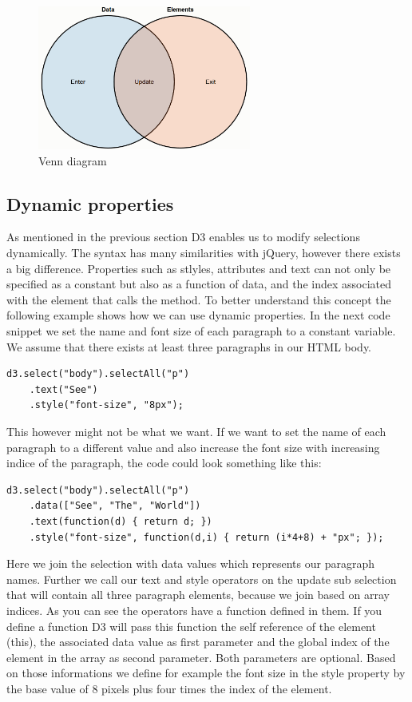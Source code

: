 \documentclass{bioinfo}
\begin{document}
\begin{figure}[!tpb]
\centerline{\includegraphics[width=70mm]{vennDiagram.PNG}} %
\caption{Venn diagram}\label{fig:venn}
\end{figure}


\subsection{Dynamic properties}
As mentioned in the previous section D3 enables us to modify selections dynamically.
The syntax has many similarities with jQuery, however there exists a big difference.
Properties such as stlyles, attributes and text can not only be specified as a constant but also as a function of data, and the index associated with the element that calls the method.
To better understand this concept the following example shows how we can use dynamic properties.
In the next code snippet we set the name and font size of each paragraph to a constant variable.
We assume that there exists at least three paragraphs in our HTML body.
\begin{lstlisting}
d3.select("body").selectAll("p")
    .text("See")
    .style("font-size", "8px");
\end{lstlisting}
This however might not be what we want. 
If we want to set the name of each paragraph to a different value and also increase the font size with increasing indice of the paragraph, the code could look something like this:
\begin{lstlisting}
d3.select("body").selectAll("p")
    .data(["See", "The", "World"])
    .text(function(d) { return d; })
    .style("font-size", function(d,i) { return (i*4+8) + "px"; });
\end{lstlisting}
Here we join the selection with data values which represents our paragraph names. Further we call our text and style operators on the update sub selection that will contain all three paragraph elements, because we join based on array indices.
As you can see the operators have a function defined in them. If you define a function D3 will pass this function the self reference of the element (this), the associated data value as first parameter and the global index of the element in the array as second parameter. Both parameters are optional. 
Based on those informations we define for example the font size in the style property by the base value of 8 pixels plus four times the index of the element.
\end{document}
